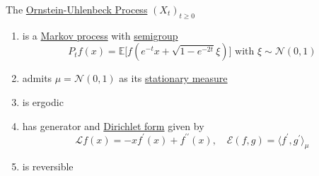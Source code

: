   \begin{theorem}
    \label{thm:properties-of-the-ornstein-uhlenbeck-process}
  The \hyperref[def:ornstein-uhlenbeck-process]{Ornstein-Uhlenbeck Process} $(X_t)_{t \geq 0}$ 
  \begin{enumerate}
      \item is a \hyperref[def:markov-process]{Markov process} with \hyperref[alg-def:semigroup]{semigroup} 
      \begin{equation}
        P_t f(x) = \mathbb{E} \big[ f(e^{-t} x + \sqrt{1 - e^{-2t}} \xi) \big] \text{ with } \xi \sim \mathcal{N}(0, 1)
      \end{equation}
      \item admits $\mu = \mathcal{N}(0, 1)$ as its \hyperref[def:stationary-measure]{stationary measure}
      \item is ergodic
      \item has generator and \hyperref[def:dirichlet-form]{Dirichlet form} given by 
      \begin{equation}
        \mathscr{L} f(x) = -x f^{\prime} (x) + f^{\prime\prime} (x), \quad \mathcal{E}(f, g) = \langle f^\prime , g^\prime \rangle_\mu
      \end{equation}
      \item is reversible
  \end{enumerate}
  \end{theorem}

